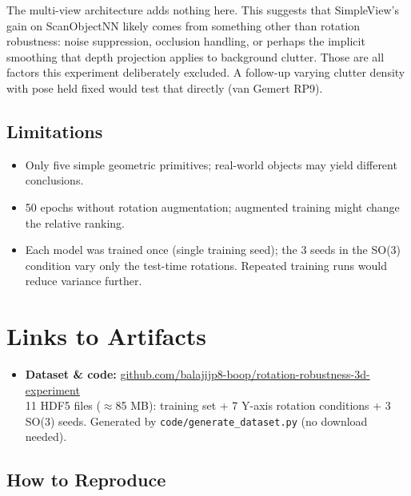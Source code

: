 \documentclass[12pt,a4paper]{article}
\begin{document}
\begin{findingbox}
The multi-view architecture adds nothing here. This suggests that SimpleView's gain on ScanObjectNN likely comes from something other than rotation robustness: noise suppression, occlusion handling, or perhaps the implicit smoothing that depth projection applies to background clutter. Those are all factors this experiment deliberately excluded. A follow-up varying clutter density with pose held fixed would test that directly (van Gemert RP9).
\end{findingbox}

\subsection*{Limitations}

\begin{itemize}[noitemsep, leftmargin=2em]
  \item Only five simple geometric primitives; real-world objects may yield different conclusions.
  \item 50 epochs without rotation augmentation; augmented training might change the relative ranking.
  \item Each model was trained once (single training seed); the 3 seeds in the SO(3) condition vary only the test-time rotations. Repeated training runs would reduce variance further.
\end{itemize}

\section{Links to Artifacts}

\begin{itemize}[leftmargin=2em]
  \item \textbf{Dataset \& code:} \href{https://github.com/balajijp8-boop/rotation-robustness-3d-experiment}{github.com/balajijp8-boop/rotation-robustness-3d-experiment}\\
    11 HDF5 files ($\approx$85 MB): training set + 7 Y-axis rotation conditions + 3 SO(3) seeds.
    Generated by \texttt{code/generate\_dataset.py} (no download needed).
\end{itemize}

\subsection*{How to Reproduce}
\end{document}
